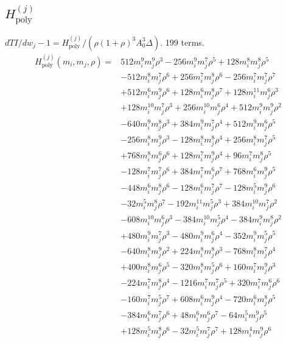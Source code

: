 \subsection*{$H^{(j)}_{\mathrm{poly}}$}
$dTI/dw_j-1=H^{(j)}_{\mathrm{poly}}/(\rho(1+\rho)^3A_0^3\Delta)$. 199 terms.
{\small
\begin{align*}
H^{(j)}_{\mathrm{poly}}(m_i,m_j,\rho)={}&512m_i^{9} m_j^{9} \rho^{3}-256m_i^{9} m_j^{7} \rho^{5}+128m_i^{8} m_j^{8} \rho^{5}\\
&-512m_i^{8} m_j^{7} \rho^{6}+256m_i^{7} m_j^{8} \rho^{6}-256m_i^{7} m_j^{7} \rho^{7}\\
&+512m_i^{6} m_j^{9} \rho^{6}+128m_i^{6} m_j^{8} \rho^{7}+128m_i^{11} m_j^{6} \rho^{3}\\
&+128m_i^{10} m_j^{7} \rho^{3}+256m_i^{10} m_j^{6} \rho^{4}+512m_i^{9} m_j^{9} \rho^{2}\\
&-640m_i^{9} m_j^{8} \rho^{3}+384m_i^{9} m_j^{7} \rho^{4}+512m_i^{9} m_j^{6} \rho^{5}\\
&-256m_i^{8} m_j^{9} \rho^{3}-128m_i^{8} m_j^{8} \rho^{4}+256m_i^{8} m_j^{7} \rho^{5}\\
&+768m_i^{8} m_j^{6} \rho^{6}+128m_i^{7} m_j^{9} \rho^{4}+96m_i^{7} m_j^{8} \rho^{5}\\
&-128m_i^{7} m_j^{7} \rho^{6}+384m_i^{7} m_j^{6} \rho^{7}+768m_i^{6} m_j^{9} \rho^{5}\\
&-448m_i^{6} m_j^{8} \rho^{6}-128m_i^{6} m_j^{7} \rho^{7}-128m_i^{5} m_j^{9} \rho^{6}\\
&-32m_i^{5} m_j^{8} \rho^{7}-192m_i^{11} m_j^{5} \rho^{3}+384m_i^{10} m_j^{7} \rho^{2}\\
&-608m_i^{10} m_j^{6} \rho^{3}-384m_i^{10} m_j^{5} \rho^{4}-384m_i^{9} m_j^{8} \rho^{2}\\
&+480m_i^{9} m_j^{7} \rho^{3}-480m_i^{9} m_j^{6} \rho^{4}-352m_i^{9} m_j^{5} \rho^{5}\\
&-640m_i^{8} m_j^{9} \rho^{2}+224m_i^{8} m_j^{8} \rho^{3}-768m_i^{8} m_j^{7} \rho^{4}\\
&+400m_i^{8} m_j^{6} \rho^{5}-320m_i^{8} m_j^{5} \rho^{6}+160m_i^{7} m_j^{9} \rho^{3}\\
&-224m_i^{7} m_j^{8} \rho^{4}-1216m_i^{7} m_j^{7} \rho^{5}+320m_i^{7} m_j^{6} \rho^{6}\\
&-160m_i^{7} m_j^{5} \rho^{7}+608m_i^{6} m_j^{9} \rho^{4}-720m_i^{6} m_j^{8} \rho^{5}\\
&-384m_i^{6} m_j^{7} \rho^{6}+48m_i^{6} m_j^{6} \rho^{7}-64m_i^{5} m_j^{9} \rho^{5}\\
&+128m_i^{5} m_j^{8} \rho^{6}-32m_i^{5} m_j^{7} \rho^{7}+128m_i^{4} m_j^{9} \rho^{6}\\

\end{align*}}

